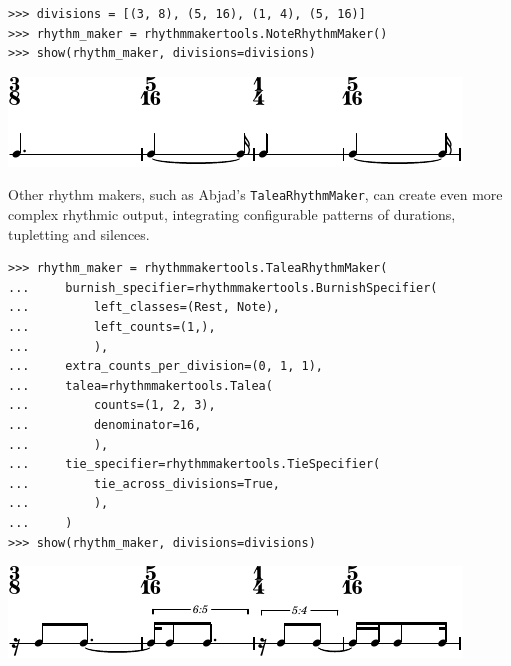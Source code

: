 \documentclass{article}
\begin{document}

\begin{lstlisting}
>>> divisions = [(3, 8), (5, 16), (1, 4), (5, 16)]
>>> rhythm_maker = rhythmmakertools.NoteRhythmMaker()
>>> show(rhythm_maker, divisions=divisions)
\end{lstlisting}
\includegraphics{assets/lilypond-911011fbb23e3c959a67793f30d2d299.pdf}

Other rhythm makers, such as Abjad's \texttt{TaleaRhythmMaker}, can create even
more complex rhythmic output, integrating configurable patterns of durations,
tupletting and silences.

\begin{lstlisting}
>>> rhythm_maker = rhythmmakertools.TaleaRhythmMaker(
...     burnish_specifier=rhythmmakertools.BurnishSpecifier(
...         left_classes=(Rest, Note),
...         left_counts=(1,),
...         ),
...     extra_counts_per_division=(0, 1, 1),
...     talea=rhythmmakertools.Talea(
...         counts=(1, 2, 3),
...         denominator=16,
...         ),
...     tie_specifier=rhythmmakertools.TieSpecifier(
...         tie_across_divisions=True,
...         ),
...     )
>>> show(rhythm_maker, divisions=divisions)
\end{lstlisting}
\includegraphics{assets/lilypond-c0d5041cb91ce3d3e6b94a69fd638cf2.pdf}
\end{document}
